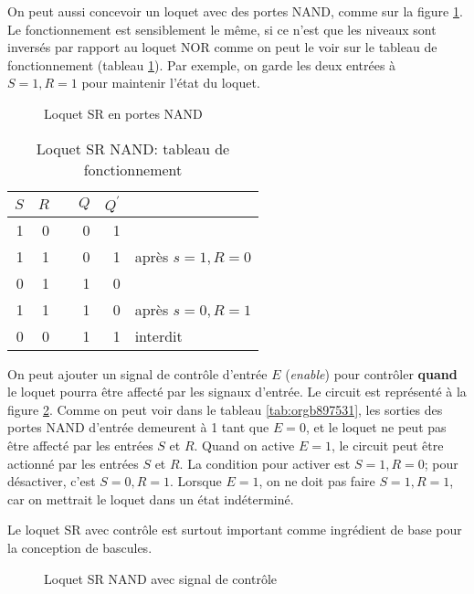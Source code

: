 \documentclass[11pt]{article}
\begin{document}
On peut aussi concevoir un loquet avec des portes NAND, comme sur la
figure \ref{fig:org723f82b}. Le fonctionnement est sensiblement le même,
si ce n'est que les niveaux sont inversés par rapport au loquet NOR
comme on peut le voir sur le tableau de fonctionnement (tableau
\ref{tab:org12840f6}). Par exemple, on garde les deux entrées à \(S=1, R=1\)
pour maintenir l'état du loquet.

\begin{figure}[htbp]
\centering

\caption{\label{fig:org723f82b}Loquet SR en portes NAND}
\end{figure}

\begin{table}[htbp]
\caption{\label{tab:org12840f6}Loquet SR NAND: tableau de fonctionnement}
\centering
\begin{tabular}{rrlrrl}
\(S\) & \(R\) &  & \(Q\) & \(Q^\prime\) & \\
\hline
1 & 0 &  & 0 & 1 & \\
1 & 1 &  & 0 & 1 & après \(s=1, R=0\)\\
0 & 1 &  & 1 & 0 & \\
1 & 1 &  & 1 & 0 & après \(s=0, R=1\)\\
0 & 0 &  & 1 & 1 & interdit\\
\end{tabular}
\end{table}

On peut ajouter un signal de contrôle d'entrée \(E\) (\emph{enable}) pour
contrôler \textbf{quand} le loquet pourra être affecté par les signaux
d'entrée. Le circuit est représenté à la figure \ref{fig:org07bcb27}. Comme
on peut voir dans le tableau \ref{tab:orgb897531}, les sorties des portes
NAND d'entrée demeurent à 1 tant que \(E = 0\), et le loquet ne peut
pas être affecté par les entrées \(S\) et \(R\). Quand on active \(E
= 1\), le circuit peut être actionné par les entrées \(S\) et \(R\). La condition pour activer est \(S=1, R=0\); pour désactiver,
c'est \(S=0, R=1\). Lorsque \(E = 1\), on ne doit pas faire \(S=1,
R=1\), car on mettrait le loquet dans un état indéterminé.

Le loquet SR avec contrôle est surtout important comme
ingrédient de base pour la conception de bascules.

\begin{figure}[htbp]
\centering

\caption{\label{fig:org07bcb27}Loquet SR NAND avec signal de contrôle}
\end{figure}
\end{document}
